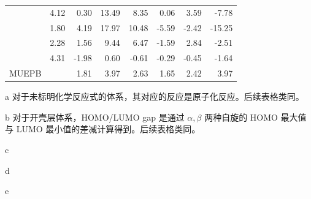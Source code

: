 \begin{table}[ht]
{\begin{tabular}{ld{2.2}d{3.2}d{3.2}d{3.2}d{3.2}d{3.2}d{3.2}}
   &  4.12  & 0.30  & 13.49 & 8.35  & 0.06      & 3.59         & -7.78       \\
            &  1.80  & 4.19  & 17.97 & 10.48 & -5.59     & -2.42        & -15.25      \\
   &  2.28  & 1.56  & 9.44  & 6.47  & -1.59     & 2.84         & -2.51       \\
   &  4.31  & -1.98 & 0.60  & -0.61 & -0.29     & -0.45        & -1.64       \\
  \midrule
  MUEPB              &        & 1.81  & 3.97  & 2.63  & 1.65      & 2.42         & 3.97        \\
  \bottomrule
  \end{tabular}
}{
  \item[a] 对于未标明化学反应式的体系，其对应的反应是原子化反应。后续表格类同。
  \item[b] 对于开壳层体系，HOMO/LUMO gap 是通过 $\alpha, \beta$ 两种自旋的 HOMO 最大值与 LUMO 最小值的差减计算得到。后续表格类同。
  \item[c] 
  \item[d] 
  \item[e] 
}
\end{table}

